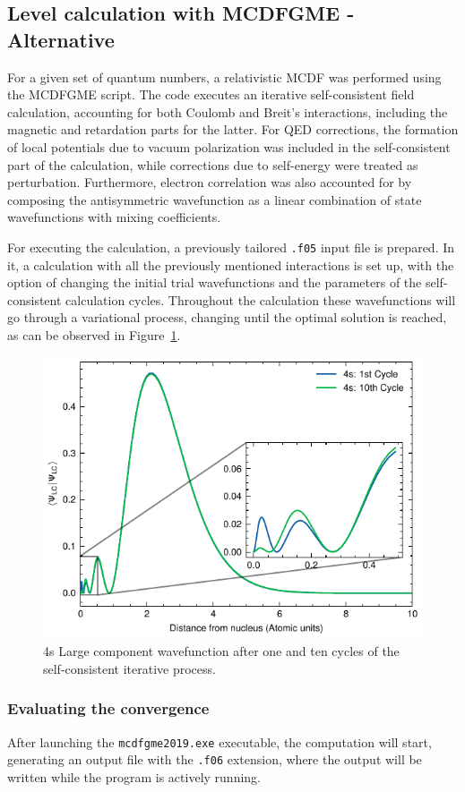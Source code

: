\subsection{Level calculation with \gls{MCDFGME} - Alternative}

For a given set of quantum numbers, a relativistic \gls{MCDF} was performed using the \gls{MCDFGME} script. The code executes an iterative self-consistent field calculation, accounting for both Coulomb and Breit's interactions, including the magnetic and retardation parts for the latter. For \gls{QED} corrections, the formation of local potentials due to vacuum polarization was included in the self-consistent part of the calculation, while corrections due to self-energy were treated as perturbation. Furthermore, electron correlation was also accounted for by composing the antisymmetric wavefunction as a linear combination of state wavefunctions with mixing coefficients.

For executing the calculation, a previously tailored \verb|.f05| input file is prepared. In it, a calculation with all the previously mentioned interactions is set up, with the option of changing the initial trial wavefunctions and the parameters of the self-consistent calculation cycles. Throughout the calculation these wavefunctions will go through a variational process, changing until the optimal solution is reached, as can be observed in Figure~\ref{fig:WFcomp}.

\begin{figure}[h!]
    \centering
    \includegraphics[width=.5\textwidth]{Chapters/Figures/Chapter2/WFcomp.pdf}
    \caption{ 4s Large component wavefunction after one and ten cycles of the self-consistent iterative process.}\label{fig:WFcomp}
\end{figure}



\subsubsection{Evaluating the convergence}
After launching the \verb|mcdfgme2019.exe| executable, the computation will start, generating an output file with the \verb|.f06| extension, where the output will be written while the program is actively running.

